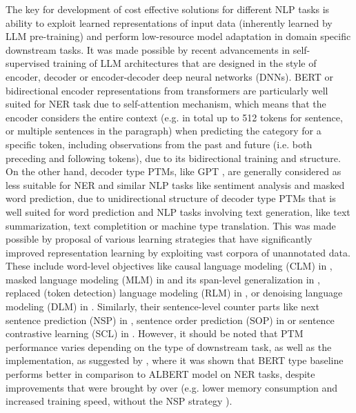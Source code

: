 The key for development of cost effective solutions for different NLP tasks is ability to exploit learned representations of input data (inherently learned by LLM pre-training) and perform low-resource model adaptation in domain specific downstream tasks. It was made possible by recent advancements in self-supervised training of LLM architectures that are designed in the style of encoder, decoder or encoder-decoder deep neural networks (DNNs). BERT \cite{kenton2019bert} or bidirectional encoder representations from transformers are particularly well suited for NER task due to self-attention mechanism, which means that the encoder considers the entire context (e.g. in total up to 512 tokens for sentence, or multiple sentences in the paragraph) when predicting the category for a specific token, including observations from the past and future (i.e. both preceding and following tokens), due to its bidirectional training and structure. On the other hand, decoder type PTMs, like GPT \cite{brown2020language}, are generally considered as less suitable for NER and similar NLP tasks like sentiment analysis and masked word prediction,  due to unidirectional structure of decoder type PTMs that is well suited for word prediction and NLP tasks involving text generation, like text summarization, text completition or machine type translation. This was made possible by proposal of various learning strategies that have significantly improved representation learning by exploiting vast corpora of unannotated data. These include word-level objectives like causal language modeling (CLM) in \cite{brown2020language}, masked language modeling (MLM) in \cite{kenton2019bert} and  its span-level generalization in \cite{joshi2020spanbert}, replaced (token detection) language modeling (RLM) in \cite{Clark2020ELECTRA}, or denoising language modeling (DLM) in \cite{lewis2020bart}. Similarly, their sentence-level counter parts like next sentence prediction (NSP) in \cite{kenton2019bert}, sentence order prediction (SOP) in \cite{Lan2020ALBERT} or sentence contrastive learning (SCL) in \cite{kim2021self}. However, it should be noted that PTM performance varies depending on the type of downstream task, as well as the implementation, as suggested by \cite{ryu2021re}, where it was shown that BERT type \cite{kenton2019bert} baseline performs better in comparison to ALBERT model \cite{Lan2020ALBERT} on NER tasks, despite improvements that were brought by \cite{Lan2020ALBERT} over \cite{kenton2019bert} (e.g. lower memory consumption and increased training speed, without the NSP strategy \cite{liu2019roberta}).

